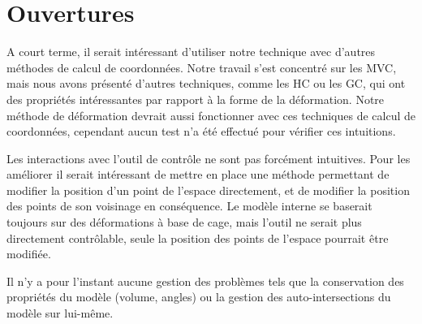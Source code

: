 \section{Ouvertures}

A court terme, il serait intéressant d'utiliser notre technique avec d'autres
méthodes de calcul de coordonnées. Notre travail s'est concentré sur les MVC,
mais nous avons présenté d'autres techniques, comme les HC ou les GC, qui ont
des propriétés intéressantes par rapport à la forme de la déformation. Notre
méthode de déformation devrait aussi fonctionner avec ces techniques de calcul
de coordonnées, cependant aucun test n'a été effectué pour vérifier ces
intuitions.

Les interactions avec l'outil de contrôle ne sont pas forcément intuitives.
Pour les améliorer il serait intéressant de mettre en place une méthode
permettant de modifier la position d'un point de l'espace directement, et de
modifier la position des points de son voisinage en conséquence. Le modèle
interne se baserait toujours sur des déformations à base de cage, mais l'outil
ne serait plus directement contrôlable, seule la position des points de
l'espace pourrait être modifiée.

Il n'y a pour l'instant aucune gestion des problèmes tels que la conservation
des propriétés du modèle (volume, angles) ou la gestion des auto-intersections
du modèle sur lui-même.



